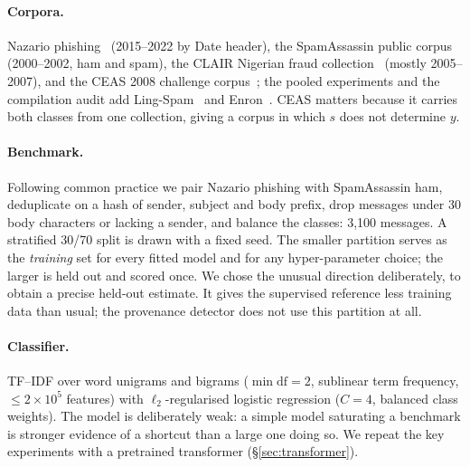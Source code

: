 \documentclass[twoside,11pt]{article}
\begin{document}
\paragraph{Corpora.} Nazario phishing~\citep{nazario_corpus} (2015--2022 by
Date header), the SpamAssassin public corpus~\citep{spamassassin_corpus}
(2000--2002, ham and spam), the CLAIR Nigerian fraud
collection~\citep{radev2008clair} (mostly 2005--2007), and the CEAS 2008
challenge corpus~\citep{ceas2008_corpus}; the pooled experiments and the
compilation audit add Ling-Spam~\citep{androutsopoulos2000lingspam} and
Enron~\citep{klimt2004}. CEAS matters because it carries both classes from one
collection, giving a corpus in which $s$ does not determine $y$.

\paragraph{Benchmark.} Following common practice we pair Nazario phishing with
SpamAssassin ham, deduplicate on a hash of sender, subject and body prefix,
drop messages under 30 body characters or lacking a sender, and balance the
classes: 3{,}100 messages. A stratified 30/70 split is drawn with a fixed seed. The
smaller partition serves as the \emph{training} set for every fitted model and
for any hyper-parameter choice; the larger is held out and scored once. We
chose the unusual direction deliberately, to obtain a precise held-out
estimate. It gives the supervised reference less training data than usual;
the provenance detector does not use this partition at all.

\paragraph{Classifier.} TF--IDF over word unigrams and bigrams
($\min\text{df}=2$, sublinear term frequency, $\leq 2\times10^5$ features)
with $\ell_2$-regularised logistic regression ($C=4$, balanced class weights).
The model is deliberately weak: a simple model saturating a benchmark is
stronger evidence of a shortcut than a large one doing so. We repeat the key
experiments with a pretrained transformer (\S\ref{sec:transformer}).
\end{document}
